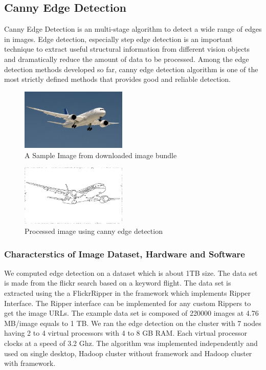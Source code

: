 \documentclass[conference]{IEEEtran}
\begin{document}
\subsection{Canny Edge Detection}

Canny Edge Detection\cite{Canny86} is an multi-stage algorithm to detect a wide range of edges in images. Edge detection, especially step edge detection is an important technique to extract useful structural information from different vision objects and dramatically reduce the amount of data to be processed. Among the edge detection methods developed so far, canny edge detection algorithm is one of the most strictly defined methods that provides good and reliable detection.

\begin{figure}[h]
	\centering
	\includegraphics[width=0.45\textwidth]{input-canny}
	\caption{A Sample Image from downloaded image bundle}
	\label{fig:input-canny}
\end{figure}

\begin{figure}[h]
	\centering
	\includegraphics[width=0.45\textwidth]{output-canny}
	\caption{Processed image using canny edge detection}
	\label{fig:output-canny}
\end{figure}

\subsubsection{Characterstics of Image Dataset, Hardware and Software}
We computed edge detection on a dataset which is about 1TB size. The data set is made from the flickr search based on a keyword flight. The data set is extracted using the a FlickrRipper in the framework which implements Ripper Interface. The Ripper interface can be implemented for any custom Rippers to get the image URLs. The example data set is composed of 220000 images at 4.76 MB/image equals to 1 TB. We ran the edge detection on the cluster with 7 nodes having 2 to 4 virtual processors with 4 to 8 GB RAM. Each virtual processor clocks at a speed of 3.2 Ghz. The algorithm was implemented independently and used on single desktop, Hadoop cluster without framework and Hadoop cluster with framework.
\end{document}
